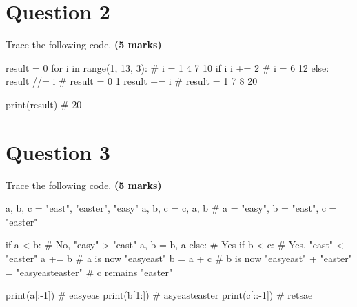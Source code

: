 \section{Question 2}
Trace the following code. \textbf{(5 marks)}
\begin{python}
result = 0
for i in range(1, 13, 3):   # i =   1   4   7   10
    if i %
        i += 2              # i =       6       12
    else:
        result //= i    # result =  0       1
    result += i         # result =  1   7   8   20

print(result)   # 20
\end{python}

\section{Question 3}
Trace the following code. \textbf{(5 marks)}
\begin{python}
a, b, c = "east", "easter", "easy"
a, b, c = c, a, b   # a = "easy", b = "east", c = "easter"

if a < b:           # No, "easy" > "east"
    a, b = b, a
else:               # Yes
    if b < c:       # Yes, "east" < "easter"
        a += b      # a is now "easyeast"
b = a + c           # b is now "easyeast" + "easter" = "easyeasteaster"
                    # c remains "easter"

print(a[:-1])   # easyeas
print(b[1:])    # asyeasteaster
print(c[::-1])  # retsae
\end{python}

